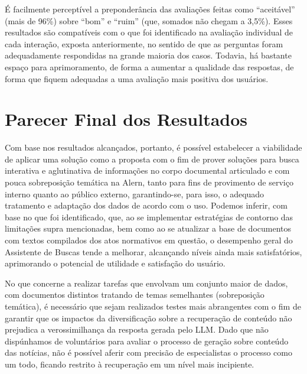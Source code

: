 É facilmente perceptível a preponderância das avaliações feitas como ``aceitável'' (mais de 96\%) sobre ``bom'' e ``ruim'' (que, somados não chegam a 3,5\%). Esses resultados são compatíveis com o que foi identificado na avaliação individual de cada interação, exposta anteriormente, no sentido de que as perguntas foram adequadamente respondidas na grande maioria dos casos. Todavia, há bastante espaço para aprimoramento, de forma a aumentar a qualidade das respostas, de forma que fiquem adequadas a uma avaliação mais positiva dos usuários.



\section{Parecer Final dos Resultados}
\label{sec:Resultados.6}
Com base nos resultados alcançados, portanto, é possível estabelecer a viabilidade de aplicar uma solução como a proposta com o fim de prover soluções para busca interativa e aglutinativa de informações no corpo documental articulado e com pouca sobreposição temática na \ac{Alern}, tanto para fins de provimento de serviço interno quanto ao público externo, garantindo-se, para isso, o adequado tratamento e adaptação dos dados de acordo com o uso. Podemos inferir, com base no que foi identificado, que, ao se implementar estratégias de contorno das limitações supra mencionadas, bem como ao se atualizar a base de documentos com textos compilados dos atos normativos em questão, o desempenho geral do Assistente de Buscas tende a melhorar, alcançando níveis ainda mais satisfatórios, aprimorando o potencial de utilidade e satisfação do usuário.

 No que concerne a realizar tarefas que envolvam um conjunto maior de dados, com documentos distintos tratando de temas semelhantes (sobreposição temática), é necessário que sejam realizados testes mais abrangentes com o fim de garantir que os impactos da diversificação sobre a recuperação de conteúdo não prejudica a verossimilhança da resposta gerada pelo \ac{LLM}. Dado que não dispúnhamos de voluntários para avaliar o processo de geração sobre conteúdo das notícias, não é possível aferir com precisão de especialistas o processo como um todo, ficando restrito à recuperação em um nível mais incipiente.